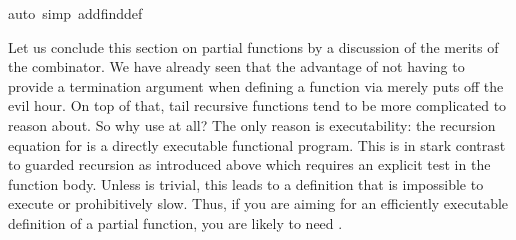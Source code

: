 \begin{isabellebody}
\isamarkupfalse%
auto\ simp\ add{\isacharcolon}find{}{\isacharunderscore}def{\isacharparenright}\isanewline
\isamarkupfalse%
\isamarkupfalse%
%
\begin{isamarkuptext}%
Let us conclude this section on partial functions by a
discussion of the merits of the  combinator. We have
already seen that the advantage of not having to
provide a termination argument when defining a function via  merely puts off the evil hour. On top of that, tail recursive
functions tend to be more complicated to reason about. So why use
 at all? The only reason is executability: the recursion
equation for  is a directly executable functional
program. This is in stark contrast to guarded recursion as introduced
above which requires an explicit test  in the
function body.  Unless  is trivial, this leads to a
definition that is impossible to execute or prohibitively slow.
Thus, if you are aiming for an efficiently executable definition
of a partial function, you are likely to need .%
\end{isamarkuptext}%
\isamarkuptrue%
\isamarkupfalse%
\end{isabellebody}%
